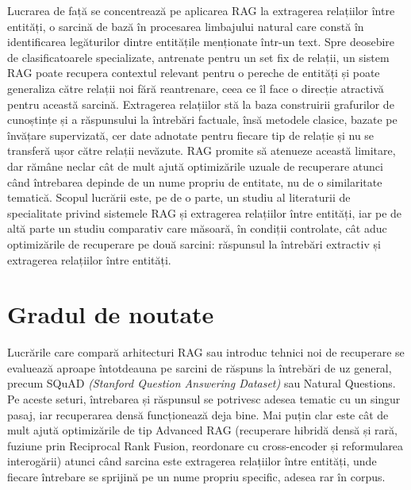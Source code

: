 Lucrarea de față se concentrează pe aplicarea RAG la extragerea relațiilor între entități, o sarcină de bază în procesarea limbajului natural care constă în identificarea legăturilor dintre entitățile menționate într-un text. Spre deosebire de clasificatoarele specializate, antrenate pentru un set fix de relații, un sistem RAG poate recupera contextul relevant pentru o pereche de entități și poate generaliza către relații noi fără reantrenare, ceea ce îl face o direcție atractivă pentru această sarcină. Extragerea relațiilor stă la baza construirii grafurilor de cunoștințe și a răspunsului la întrebări factuale, însă metodele clasice, bazate pe învățare supervizată, cer date adnotate pentru fiecare tip de relație și nu se transferă ușor către relații nevăzute. RAG promite să atenueze această limitare, dar rămâne neclar cât de mult ajută optimizările uzuale de recuperare atunci când întrebarea depinde de un nume propriu de entitate, nu de o similaritate tematică. Scopul lucrării este, pe de o parte, un studiu al literaturii de specialitate privind sistemele RAG și extragerea relațiilor între entități, iar pe de altă parte un studiu comparativ care măsoară, în condiții controlate, cât aduc optimizările de recuperare pe două sarcini: răspunsul la întrebări extractiv și extragerea relațiilor între entități.

\section*{Gradul de noutate}

Lucrările care compară arhitecturi RAG sau introduc tehnici noi de recuperare se evaluează aproape întotdeauna pe sarcini de răspuns la întrebări de uz general, precum SQuAD \textit{(Stanford Question Answering Dataset)} sau Natural Questions. Pe aceste seturi, întrebarea și răspunsul se potrivesc adesea tematic cu un singur pasaj, iar recuperarea densă funcționează deja bine. Mai puțin clar este cât de mult ajută optimizările de tip Advanced RAG (recuperare hibridă densă și rară, fuziune prin Reciprocal Rank Fusion, reordonare cu cross-encoder și reformularea interogării) atunci când sarcina este extragerea relațiilor între entități, unde fiecare întrebare se sprijină pe un nume propriu specific, adesea rar în corpus.

